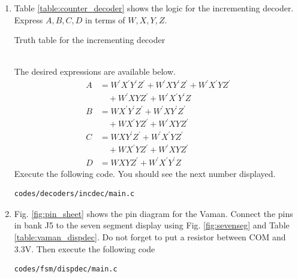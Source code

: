 \documentclass[journal,12pt,twocolumn]{IEEEtran}
\renewcommand\thesection{\arabic{section}}
\begin{document}
\begin{enumerate}[label=\thesection.\arabic*.,ref=\thesection.\theenumi]
\item Table \ref{table:counter_decoder} shows the logic for the incrementing decoder.  Express $A,B,C,D$ in terms of $W,X,Y,Z$.
\label{prob:counter_decoder}
\begin{table}
\centering

\caption{Truth table for the incrementing decoder}
\label{table:counter_decoder}
\end{table}
\\
\solution The desired expressions are available below. 
\begin{align}
\label{eq:inc_A}
A &= W^{\prime}X^{\prime}Y^{\prime}Z^{\prime} + W^{\prime}XY^{\prime}Z^{\prime}
+W^{\prime}X^{\prime}YZ^{\prime}
\nonumber \\
 & \quad +W^{\prime}XYZ^{\prime}
+W^{\prime}X^{\prime}Y^{\prime}Z
\\
\label{eq:inc_B}
B &= WX^{\prime}Y^{\prime}Z^{\prime} + W^{\prime}XY^{\prime}Z^{\prime}
\nonumber \\ 
& \quad 
+WX^{\prime}YZ^{\prime}
+W^{\prime}XYZ^{\prime}
\\
\label{eq:inc_C}
C &= WXY^{\prime}Z^{\prime} + W^{\prime}X^{\prime}YZ^{\prime}
\nonumber \\ 
& \quad 
+WX^{\prime}YZ^{\prime}
+W^{\prime}XYZ^{\prime}
\\
D &= WXYZ^{\prime} + W^{\prime}X^{\prime}Y^{\prime}Z
\label{eq:inc_D}
\end{align}
Execute the following code.  You should see the next number displayed.

\begin{lstlisting}
codes/decoders/incdec/main.c
\end{lstlisting}
%
%
\item Fig. \ref{fig:pin_sheet} shows the pin diagram for the Vaman.  Connect the pins in bank J5 to the seven segment display using
Fig. \ref{fig:sevenseg} and Table \ref{table:vaman_dispdec}.  Do not forget to put a resistor between COM and 3.3V.  Then execute the following code 
\begin{lstlisting}
codes/fsm/dispdec/main.c
\end{lstlisting}
%


\end{enumerate}
\end{document}

